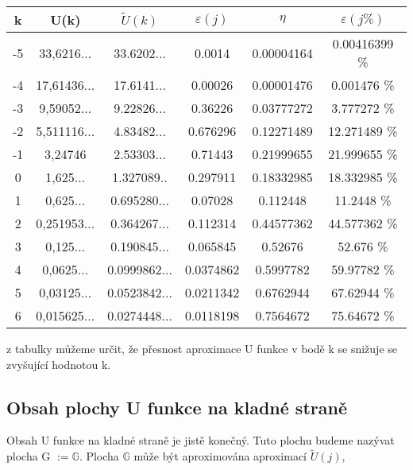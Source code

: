 \begin{table}[h!]
      \centering
       \begin{tabular}{||c c c c c c||} 
             \hline
             k & U(k) & \(\tilde{U}(k)\) &  \(\varepsilon(j)\)  & \(\eta\) & \(\varepsilon(j\%)\)  \\ [0.5ex] 
            \hline\hline
            -5 & 33,6216... & 33.6202... & 0.0014 & 0.00004164 & 0.00416399 \% \\
            -4 & 17,61436...& 17.6141... & 0.00026 & 0.00001476 & 0.001476 \%\\
                  -3 & 9,59052... & 9.22826...& 0.36226 & 0.03777272 & 3.777272 \% \\
            -2 & 5,511116... & 4.83482...&  0.676296 & 0.12271489 & 12.271489 \% \\
            -1 & 3,24746 & 2.53303... & 0.71443 & 0.21999655 & 21.999655 \% \\
            0  & 1,625...  & 1.327089..& 0.297911 & 0.18332985 & 18.332985 \% \\
                  1 & 0,625... & 0.695280...& 0.07028 & 0.112448 & 11.2448 \% \\
            2  & 0,251953...  & 0.364267... & 0.112314 & 0.44577362 & 44.577362 \% \\
            3 & 0,125... & 0.190845...  & 0.065845 & 0.52676 & 52.676 \% \\
            4  & 0,0625... & 0.0999862...  & 0.0374862 & 0.5997782 & 59.97782 \%\\
            5  & 0,03125... & 0.0523842... & 0.0211342 & 0.6762944 & 67.62944 \% \\
            6  & 0,015625... & 0.0274448...  & 0.0118198 & 0.7564672 & 75.64672 \% \\ [1ex] 
            \hline
      \end{tabular}
\end{table}

z tabulky můžeme určit, že přesnost aproximace U funkce
v bodě k se snižuje se zvyšující hodnotou k.

\subsection{Obsah plochy U funkce na kladné straně}

Obsah U funkce na kladné straně je jistě konečný. Tuto plochu
budeme nazývat plocha G \(:=\mathbb{G}\). Plocha \(\mathbb{G}\) 
může být aproximována aproximací \(\tilde{U}(j)\),

